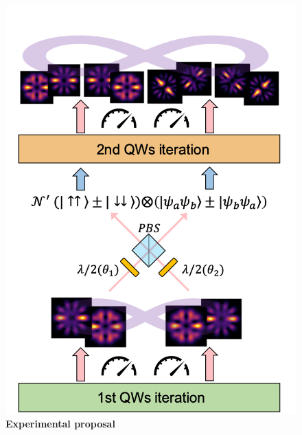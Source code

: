 \documentclass[
	aps, pra,
	superscriptaddress, twocolumn,
	floatfix,
	10pt
]{revtex4-1}
\begin{document}

\begin{figure}[t]
    \centering
    \includegraphics[scale= 0.45]{figures/conceptual_fig_2.png}
    \caption{\textbf{Experimental proposal}}
    \label{fig:conceptual_fig_2}
\end{figure}
\end{document}
